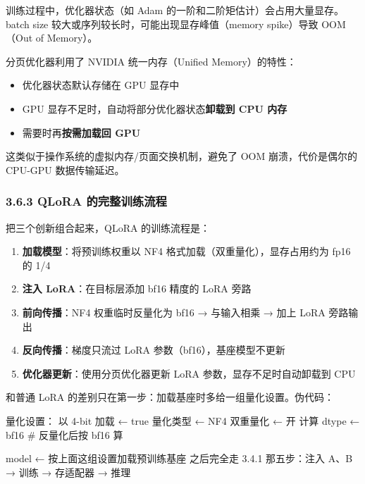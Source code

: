 \documentclass[
  chinese,
]{ctexart}
\newenvironment{Shaded}{\begin{snugshade}}{\end{snugshade}}
\newcommand{\NormalTok}[1]{\textcolor[rgb]{0.00,0.23,0.31}{#1}}
\providecommand{\tightlist}{%
  \setlength{\itemsep}{0pt}\setlength{\parskip}{0pt}}
\begin{document}
训练过程中，优化器状态（如 Adam
的一阶和二阶矩估计）会占用大量显存。batch size
较大或序列较长时，可能出现显存峰值（memory spike）导致 OOM（Out of
Memory）。

分页优化器利用了 NVIDIA 统一内存（Unified Memory）的特性：

\begin{itemize}
\tightlist
\item
  优化器状态默认存储在 GPU 显存中
\item
  GPU 显存不足时，自动将部分优化器状态\textbf{卸载到 CPU 内存}
\item
  需要时再\textbf{按需加载回 GPU}
\end{itemize}

这类似于操作系统的虚拟内存/页面交换机制，避免了 OOM 崩溃，代价是偶尔的
CPU-GPU 数据传输延迟。

\subsubsection{3.6.3 QLoRA
的完整训练流程}\label{qlora-ux7684ux5b8cux6574ux8badux7ec3ux6d41ux7a0b}

把三个创新组合起来，QLoRA 的训练流程是：

\begin{enumerate}
\def\labelenumi{\arabic{enumi}.}
\tightlist
\item
  \textbf{加载模型}：将预训练权重以 NF4
  格式加载（双重量化），显存占用约为 fp16 的 1/4
\item
  \textbf{注入 LoRA}：在目标层添加 bf16 精度的 LoRA 旁路
\item
  \textbf{前向传播}：NF4 权重临时反量化为 bf16 → 与输入相乘 → 加上 LoRA
  旁路输出
\item
  \textbf{反向传播}：梯度只流过 LoRA 参数（bf16），基座模型不更新
\item
  \textbf{优化器更新}：使用分页优化器更新 LoRA
  参数，显存不足时自动卸载到 CPU
\end{enumerate}

和普通 LoRA 的差别只在第一步：加载基座时多给一组量化设置。伪代码：

\begin{Shaded}
\begin{Highlighting}[]
\NormalTok{量化设置：}
\NormalTok{    以 4{-}bit 加载      ← true}
\NormalTok{    量化类型           ← NF4}
\NormalTok{    双重量化           ← 开}
\NormalTok{    计算 dtype        ← bf16     \# 反量化后按 bf16 算}

\NormalTok{model ← 按上面这组设置加载预训练基座}
\NormalTok{之后完全走 3.4.1 那五步：注入 A、B → 训练 → 存适配器 → 推理}
\end{Highlighting}
\end{Shaded}
\end{document}
